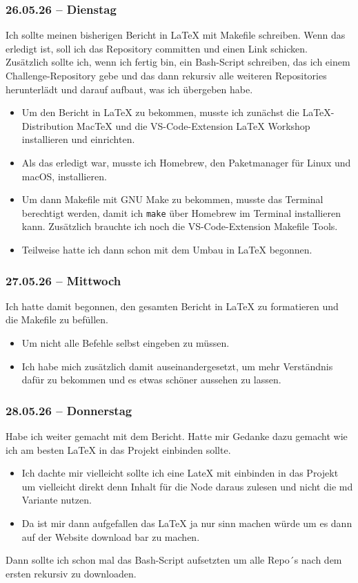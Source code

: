 \subsubsection{26.05.26 -- Dienstag}

Ich sollte meinen bisherigen Bericht in LaTeX mit Makefile schreiben. Wenn das erledigt ist, soll ich das Repository committen und einen Link schicken. Zusätzlich sollte ich, wenn ich fertig bin, ein Bash-Script schreiben, das ich einem Challenge-Repository gebe und das dann rekursiv alle weiteren Repositories herunterlädt und darauf aufbaut, was ich übergeben habe.
\begin{itemize}
    \item Um den Bericht in LaTeX zu bekommen, musste ich zunächst die LaTeX-Distribution MacTeX und die VS-Code-Extension LaTeX Workshop installieren und einrichten.
    \item Als das erledigt war, musste ich Homebrew, den Paketmanager für Linux und macOS, installieren.
    \item Um dann Makefile mit GNU Make zu bekommen, musste das Terminal berechtigt werden, damit ich \texttt{make} über Homebrew im Terminal installieren kann. Zusätzlich brauchte ich noch die VS-Code-Extension Makefile Tools.
    \item Teilweise hatte ich dann schon mit dem Umbau in LaTeX begonnen.
\end{itemize}

\subsubsection{27.05.26 -- Mittwoch}

Ich hatte damit begonnen, den gesamten Bericht in LaTeX zu formatieren und die Makefile zu befüllen.
\begin{itemize}
    \item Um nicht alle Befehle selbst eingeben zu müssen.
    \item Ich habe mich zusätzlich damit auseinandergesetzt, um mehr Verständnis dafür zu bekommen und es etwas schöner aussehen zu lassen.
\end{itemize}

\subsubsection{28.05.26 -- Donnerstag}

Habe ich weiter gemacht mit dem Bericht. Hatte mir Gedanke dazu gemacht wie ich am besten LaTeX in das Projekt einbinden sollte.
\begin{itemize}
  \item Ich dachte mir vielleicht sollte ich eine LateX mit einbinden in das Projekt um vielleicht direkt denn Inhalt für die Node daraus zulesen und nicht die md Variante nutzen.
  \item Da ist mir dann aufgefallen das LaTeX ja nur sinn machen würde um es dann auf der Website download bar zu machen.
\end{itemize}
Dann sollte ich schon mal das Bash-Script aufsetzten um alle Repo´s nach dem ersten rekursiv zu downloaden.


